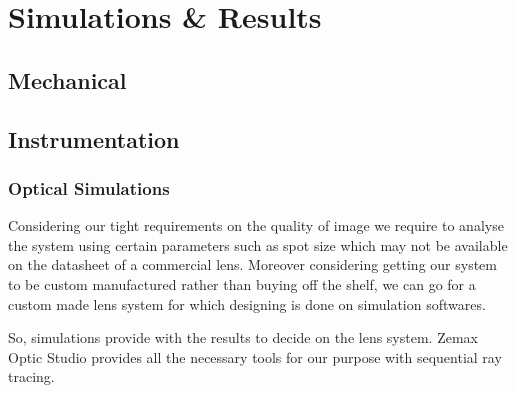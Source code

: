 \documentclass[../../main.tex]{subfiles}
\begin{document}
\chapter{Simulations \& Results}
\thispagestyle{fancy}


\section{Mechanical}
\blindtext

\section{Instrumentation}
\subsection{Optical Simulations}
Considering our tight requirements on the quality of image we require to analyse the system using certain parameters such as spot size which may not be available on the datasheet of a commercial lens.
Moreover considering getting our system to be custom manufactured rather than buying off the shelf, we can go for a custom made lens system for which designing is done on simulation softwares.

So, simulations provide with the results to decide on the lens system.
Zemax Optic Studio provides all the necessary tools for our purpose with sequential ray tracing.
\end{document}
